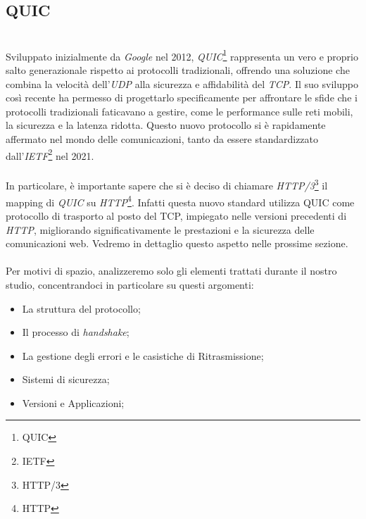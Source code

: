 \subsection{QUIC}
~\\
\indent Sviluppato inizialmente da \emph{Google} nel 2012, \emph{QUIC}\footnote{\gls{QUIC}} rappresenta un vero e proprio salto generazionale rispetto ai protocolli tradizionali, offrendo una soluzione che combina la velocità dell'\emph{UDP} alla sicurezza e affidabilità del \emph{TCP}. 
Il suo sviluppo così recente ha permesso di progettarlo specificamente per affrontare le sfide che i protocolli tradizionali faticavano a gestire, come le performance sulle reti mobili, la sicurezza e la latenza ridotta. Questo nuovo protocollo si è rapidamente affermato nel mondo delle comunicazioni, tanto da essere standardizzato dall'\emph{IETF}\footnote{\gls{IETF}} nel 2021.
\\\\
In particolare, è importante sapere che si è deciso di chiamare \emph{HTTP/3}\footnote{\gls{HTTP/3}} il mapping di \emph{QUIC} su \emph{HTTP}\footnote{\gls{HTTP}}. Infatti questa nuovo standard utilizza QUIC come protocollo di trasporto al posto del TCP, impiegato nelle versioni precedenti di \emph{HTTP}, migliorando significativamente le prestazioni e la sicurezza delle comunicazioni web.
Vedremo in dettaglio questo aspetto nelle prossime sezione.
\\\\
\noindent Per motivi di spazio, analizzeremo solo gli elementi trattati durante il nostro studio, concentrandoci in particolare su questi argomenti:
\begin{itemize}
    \item La struttura del protocollo;
    \item Il processo di \emph{handshake};
    \item La gestione degli errori e le casistiche di Ritrasmissione;
    \item Sistemi di sicurezza;
    \item Versioni e Applicazioni;
\end{itemize}

